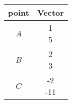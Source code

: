 \begin{tabular}[12pt]{|c|c|}
     \hline
     {point} & {Vector}\\
     \hline
     $A$ & \myvec{1\\5}\\
     \hline
     $B$ & \myvec{2\\3}\\
     \hline
     $C$ & \myvec{-2\\-11}\\
     \hline
     
\end{tabular}